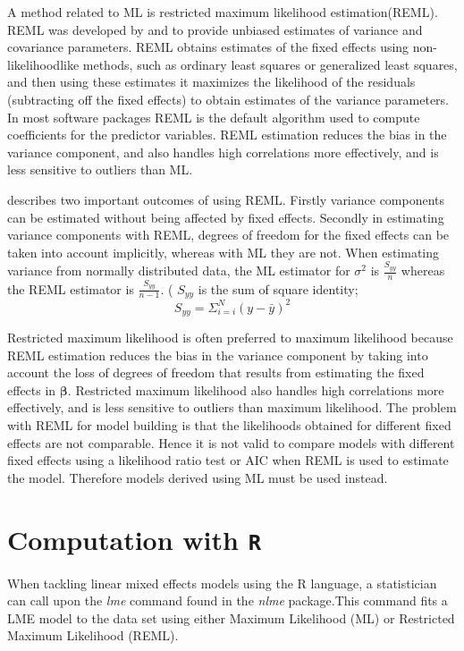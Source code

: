 \documentclass[12pt, a4paper]{report}
\theoremstyle{plain}
\theoremstyle{definition}
\theoremstyle{remark}
\begin{document}
A method related to ML is restricted maximum likelihood
estimation(REML). REML was developed by \citet*{PT71} and
\citet{Harville} to provide unbiased estimates of variance and
covariance parameters. REML obtains estimates of the fixed effects
using non-likelihoodlike methods, such as ordinary least squares
or generalized least squares, and then using these estimates it
maximizes the likelihood of the residuals (subtracting off the
fixed effects) to obtain estimates of the variance parameters. In
most software packages REML is the default algorithm used to
compute coefficients for the predictor variables. REML estimation
reduces the bias in the variance component, and also handles high
correlations more effectively, and is less sensitive to outliers
than ML.

\citet{McCullSearle} describes two important outcomes of using
REML. Firstly variance components can be estimated without being
affected by fixed effects. Secondly in estimating variance
components with REML, degrees of freedom for the fixed effects can
be taken into account implicitly, whereas with ML they are not.
When estimating variance from normally distributed data, the ML
estimator for $\sigma^{2}$ is $\frac{S_{yy}}{n}$ whereas the REML
estimator is $\frac{S_{yy}}{n-1}$. ( $S_{yy}$ is the sum of square
identity;
\begin{equation}
S_{yy} = \Sigma_{i=i}^{N} (y-\bar{y})^{2}
\end{equation}

Restricted maximum likelihood is often preferred to maximum likelihood because REML estimation reduces the bias in the variance component by taking into account the loss of degrees of freedom that results
from estimating the fixed effects in $\boldsymbol{\beta}$. Restricted maximum likelihood also handles high correlations more effectively, and is less sensitive to outliers than maximum likelihood.  The problem with REML for model building is that the likelihoods obtained for different fixed effects are not comparable. Hence it is not valid to compare models with different fixed effects using a likelihood ratio test or AIC when REML is used to
estimate the model. Therefore models derived using ML must be used instead.










\section{Computation with \texttt{R}} When tackling linear mixed effects models
using the R language, a statistician can call upon the \emph{lme}
command found in the \emph{nlme} package.This command fits a LME
model to the data set using either Maximum Likelihood (ML) or
Restricted Maximum Likelihood (REML).
\end{document}

